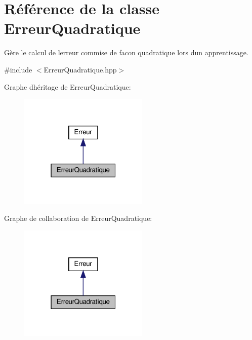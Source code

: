 \hypertarget{classErreurQuadratique}{}\section{Référence de la classe Erreur\+Quadratique}
\label{classErreurQuadratique}


Gère le calcul de l\textquotesingle{}erreur commise de facon quadratique lors d\textquotesingle{}un apprentissage.  




{\ttfamily \#include $<$Erreur\+Quadratique.\+hpp$>$}



Graphe d\textquotesingle{}héritage de Erreur\+Quadratique\+:
\nopagebreak
\begin{figure}[H]
\begin{center}
\leavevmode
\includegraphics[width=175pt]{classErreurQuadratique__inherit__graph}
\end{center}
\end{figure}


Graphe de collaboration de Erreur\+Quadratique\+:
\nopagebreak
\begin{figure}[H]
\begin{center}
\leavevmode
\includegraphics[width=175pt]{classErreurQuadratique__coll__graph}
\end{center}
\end{figure}
